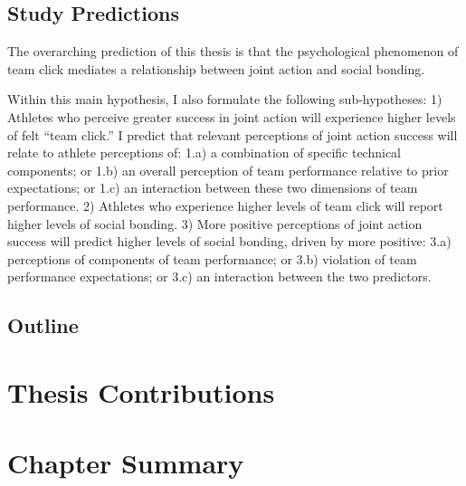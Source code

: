       \subsection{Study Predictions}



      The overarching prediction of this thesis is that the psychological phenomenon of team click mediates a relationship between joint action and social bonding.

      Within this main hypothesis, I also formulate the following sub-hypotheses:
      1)	Athletes who perceive greater success in joint action will experience higher levels of felt ``team click.'' I predict that relevant perceptions of joint action success will relate to athlete perceptions of:
      1.a) a combination of specific technical components; or
      1.b) an overall perception of team performance relative to prior expectations; or
      1.c) an interaction between these two dimensions of team performance.
      2)	Athletes who experience higher levels of team click will report higher levels of social bonding.
      3)	More positive perceptions of joint action success will predict higher levels of social bonding, driven by more positive:
      3.a) perceptions of components of team performance; or
      3.b) violation of team performance expectations; or
      3.c) an interaction between the two predictors.




      \subsection{Outline}



\section{Thesis Contributions}

\section{Chapter Summary}





























